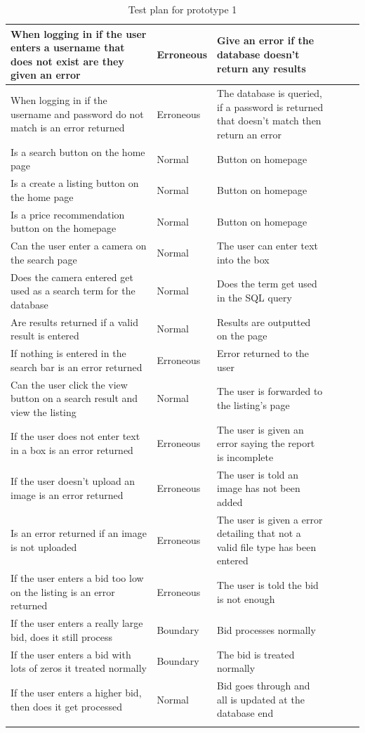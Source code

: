 \begin{center}
\begin{longtable}{|P{3cm}|P{1.7cm}|P{3cm}|P{2.6cm}|P{2cm}|}
        When logging in if the user enters a username that does not exist are they given an error & Erroneous & Give an error if the database doesn’t return any results & ~ & ~ \\ \hline
        When logging in if the username and password do not match is an error returned & Erroneous & The database is queried, if a password is returned that doesn’t match then return an error & ~ & ~ \\ \hline
        Is a search button on the home page & Normal & Button on homepage & ~ & ~ \\ \hline
        Is a create a listing button on the home page & Normal & Button on homepage & ~ & ~ \\ \hline
        Is a price recommendation button on the homepage & Normal & Button on homepage & ~ & ~ \\ \hline
        Can the user enter a camera on the search page & Normal & The user can enter text into the box & ~ & ~ \\ \hline
        Does the camera entered get used as a search term for the database & Normal & Does the term get used in the SQL query & ~ & ~ \\ \hline
        Are results returned if a valid result is entered & Normal & Results are outputted on the page & ~ & ~ \\ \hline
        If nothing is entered in the search bar is an error returned & Erroneous & Error returned to the user & ~ & ~ \\ \hline
        Can the user click the view button on a search result and view the listing & Normal & The user is forwarded to the listing’s page & ~ & ~ \\ \hline
        If the user does not enter text in a box is an error returned & Erroneous & The user is given an error saying the report is incomplete & ~ & ~ \\ \hline
        If the user doesn’t upload an image is an error returned & Erroneous & The user is told an image has not been added & ~ & ~ \\ \hline
        Is an error returned if an image is not uploaded & Erroneous & The user is given a error detailing that not a valid file type has been entered & ~ & ~ \\ \hline
        If the user enters a bid too low on the listing is an error returned & Erroneous & The user is told the bid is not enough & ~ & ~ \\ \hline
        If the user enters a really large bid, does it still process & Boundary & Bid processes normally & ~ & ~ \\ \hline
        If the user enters a bid with lots of zeros it treated normally & Boundary & The bid is treated normally & ~ & ~ \\ \hline
        If the user enters a higher bid, then does it get processed & Normal & Bid goes through and all is updated at the database end & ~ & ~ \\ \hline

    \caption{Test plan for prototype 1}
\label{tab:proto1_test_plan}
\end{longtable}
\end{center}